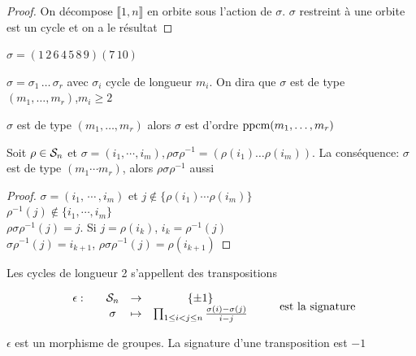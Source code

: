 \documentclass[]{report}
\begin{document}
    \begin{proof}
        On décompose $\llbracket 1,n\rrbracket$ en orbite sous l'action de $\sigma$. $\sigma$ restreint à une orbite est un cycle et on a le résultat
    \end{proof}

    \begin{ex}{}{}
        $\sigma=(1\,2\,6\,4\,5\,8\,9)(7\,10)$
    \end{ex}

    \begin{nt}{}{}
        $\sigma=\sigma_1\,\ldots\,\sigma_r$ avec $\sigma_i$ cycle de longueur $m_i$. On dira que $\sigma$ est de type $(m_1,\ldots,m_r)$,$m_i\ge 2$
    \end{nt}

    \begin{re}{}{}
        $\sigma$ est de type $(m_1,\ldots,m_r)$ alors $\sigma$ est d'ordre $\text{ppcm}(m_1,\ldots,m_r)$
    \end{re}

    \begin{lm}{}{}
        Soit $\rho\in\mathcal{S}_n$ et $\sigma=(i_1,\cdots,i_m),\rho\sigma\rho^{-1}=(\rho(i_1)\ldots\rho(i_m))$. La conséquence: $\sigma$ est de type $(m_1\cdots m_r)$, alors $\rho\sigma\rho^{-1}$ aussi
    \end{lm}

    \begin{proof}
        $\sigma=(i_1,\,\cdots\, ,i_m)$ et $j\not\in \{\rho(i_1)\cdots\rho(i_m)\}$\\
        $\rho^{-1}(j)\not\in\{i_1,\cdots ,i_m\}$\\
        $\rho\sigma\rho^{-1}(j)=j$. Si $j=\rho(i_k)$, $i_k=\rho^{-1}(j)$\\
        $\sigma\rho^{-1}(j)=i_{k+1}$, $\rho\sigma\rho^{-1}(j)=\rho(i_{k+1})$
    \end{proof}

    \begin{df}{}{}
        Les cycles de longueur 2 s'appellent des transpositions
    \end{df}

    \begin{df}{}{}
        \[\begin{array}{ccccc} \epsilon : & & \mathcal{S}_n & \to & \{\pm 1\} \\ & & \sigma & \mapsto & \prod_{1\le i < j \le n}\frac{\sigma(i)-\sigma(j)}{i-j} \end{array}\qquad \text{ est la signature}\]
    \end{df}

    \begin{prop}{}{}
        $\epsilon$ est un morphisme de groupes. La signature d'une transposition est $-1$
    \end{prop}
\end{document}
